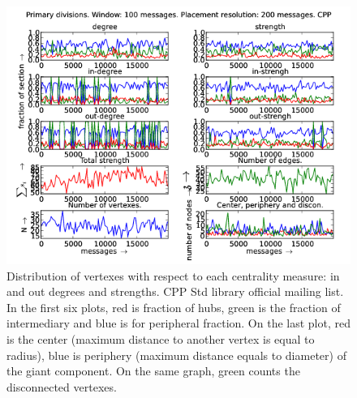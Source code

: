 \documentclass[%
 aip,
 jmp,%
 amsmath,amssymb,
 reprint,%
]{revtex4-1}
\begin{document}
\begin{figure}[hbtp] 
   \centering
        \includegraphics[width=\textwidth]{figs/CPP/100}
    \caption{Distribution of vertexes with respect to each centrality measure: in and out degrees and strengths. CPP Std library official mailing list. In the first six plots, red is fraction of hubs, green is the fraction of intermediary and blue is for peripheral fraction. On the last plot, red is the center (maximum distance to another vertex is equal to radius), blue is periphery (maximum distance equals to diameter) of the giant component. On the same graph, green counts the disconnected vertexes.}
    \label{fig:cpp100}
\end{figure}
\end{document}
